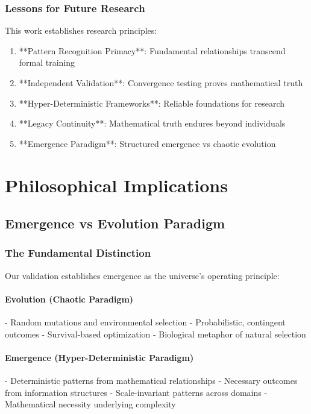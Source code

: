 \documentclass[12pt]{article}
\begin{document}
\subsubsection{Lessons for Future Research}

This work establishes research principles:

\begin{enumerate}
    \item **Pattern Recognition Primacy**: Fundamental relationships transcend formal training
    \item **Independent Validation**: Convergence testing proves mathematical truth
    \item **Hyper-Deterministic Frameworks**: Reliable foundations for research
    \item **Legacy Continuity**: Mathematical truth endures beyond individuals
    \item **Emergence Paradigm**: Structured emergence vs chaotic evolution
\end{enumerate}

\section{Philosophical Implications}

\subsection{Emergence vs Evolution Paradigm}

\subsubsection{The Fundamental Distinction}

Our validation establishes emergence as the universe's operating principle:

\paragraph{Evolution (Chaotic Paradigm)}
- Random mutations and environmental selection
- Probabilistic, contingent outcomes
- Survival-based optimization
- Biological metaphor of natural selection

\paragraph{Emergence (Hyper-Deterministic Paradigm)}
- Deterministic patterns from mathematical relationships
- Necessary outcomes from information structures
- Scale-invariant patterns across domains
- Mathematical necessity underlying complexity
\end{document}
